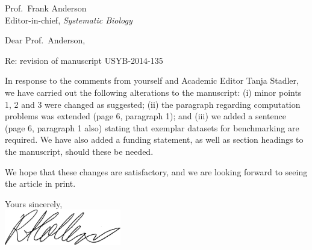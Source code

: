 \documentclass[a4paper,12pt]{letter}
\begin{document}
\begin{letter}{Prof.\ Frank Anderson \\ Editor-in-chief, \emph{Systematic Biology}}

\opening{Dear Prof.\ Anderson,} 

Re: revision of manuscript USYB-2014-135


In response to the comments from yourself and Academic Editor Tanja Stadler, we have carried out the following alterations to the manuscript: (i) minor points 1, 2 and 3 were changed as suggested; (ii) the paragraph regarding computation problems was extended (page 6, paragraph 1); and (iii) we added a sentence (page 6, paragraph 1 also) stating that exemplar datasets for benchmarking are required. We have also added a funding statement, as well as section headings to the manuscript, should these be needed.

We hope that these changes are satisfactory, and we are looking forward to seeing the article in print. 

\closing{Yours sincerely,\\ 
\vspace{10 mm}
\includegraphics[width=2in]{signature.png}}

%

\end{letter}
\end{document}
